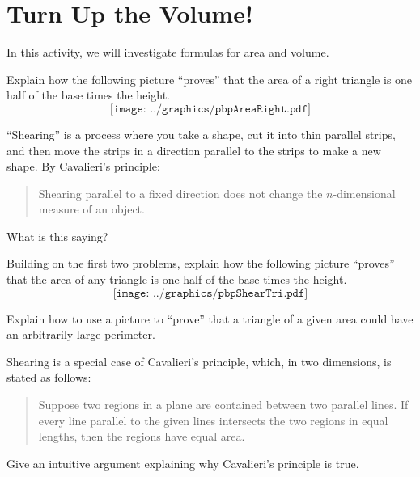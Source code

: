 \newpage
\section{Turn Up the Volume!}

In this activity, we will investigate formulas for area and
volume.


\begin{prob}
Explain how the following picture ``proves'' that the area of a right
  triangle is one half of the base times the height.
\[
\texttt{[image: ../graphics/pbpAreaRight.pdf]}
\]
\end{prob}

\begin{prob}
``Shearing'' is a process where you take a shape, cut it into thin parallel strips, 
and then move the strips in a direction parallel to the strips to make a new shape.  
By Cavalieri's principle:
\begin{quote}
Shearing parallel to a fixed direction does not change the $n$-dimensional measure of an object.
\end{quote}
What is this saying?
\end{prob}

\begin{prob}
Building on the first two problems, explain how the following picture
  ``proves'' that the area of any triangle is one half of the base times the
  height.
\[
\texttt{[image: ../graphics/pbpShearTri.pdf]}
\]
\end{prob}

\begin{prob}
Explain how to use a picture to ``prove'' that a triangle of a given
  area could have an arbitrarily large perimeter.
\end{prob}
\vspace{.25in}

\begin{prob}
Shearing is a special case of Cavalieri's principle, which, in two dimensions, is stated as follows:  
\begin{quote}
Suppose two regions in a plane are contained between two parallel lines.  If every line parallel to the given lines intersects the two regions in equal lengths, then the regions have equal area.  
\end{quote}
Give an intuitive argument explaining why Cavalieri's principle is true.
\end{prob}

